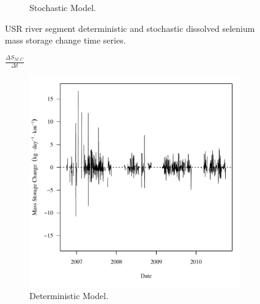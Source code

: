 \begin{linenumbers}
\begin{landscape}
\begin{figure}
\begin{subfigure}{0.7\textwidth}
			\caption{Stochastic Model.}
		\end{subfigure}
		\caption{USR river segment deterministic and stochastic dissolved selenium mass storage change time series.}
	\end{figure}
\end{landscape}

\subfiguremid
\begin{landscape}
	\begin{figure}
		$ \displaystyle \frac{\Delta S_{M,C}}{\Delta t} $
		\begin{subfigure}{0.7\textwidth}
			\centering
			\includegraphics[width=\tableCustomSize]{"Figures/Results_USR/Deterministic/f Segment C"}
			\caption{Deterministic Model.}
		\end{subfigure}%
		\begin{subfigure}{0.7\textwidth}
			\centering

\end{subfigure}
\end{figure}
\end{landscape}
\end{linenumbers}
